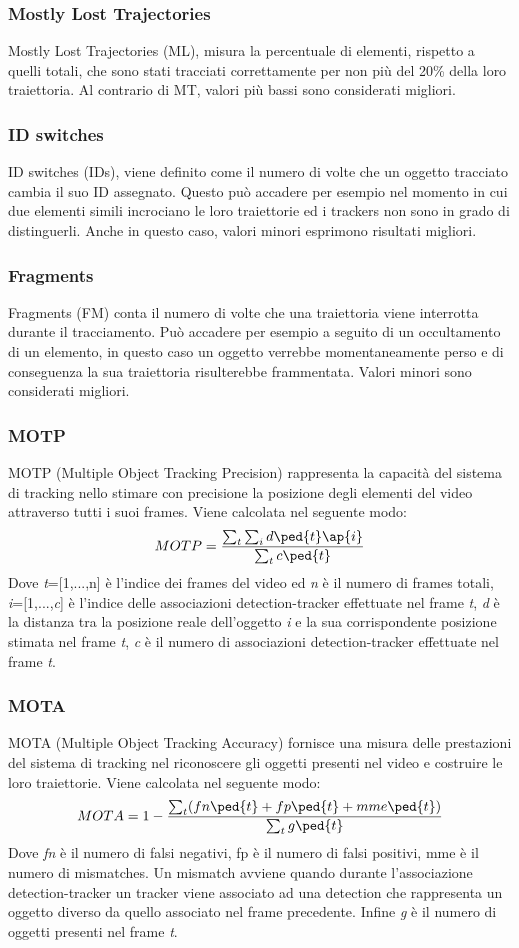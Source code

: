 \subsubsection{Mostly Lost Trajectories}
Mostly Lost Trajectories (ML), misura la percentuale di elementi, rispetto a quelli totali, che sono stati tracciati correttamente per non più del 20\% della loro traiettoria. Al contrario di MT, valori più bassi sono considerati migliori.
\subsubsection{ID switches}
ID switches (IDs), viene definito come il numero di volte che un oggetto tracciato cambia il suo ID assegnato. Questo può accadere per esempio nel momento in cui due elementi simili incrociano le loro traiettorie ed i trackers non sono in grado di distinguerli. Anche in questo caso, valori minori esprimono risultati migliori.
\subsubsection{Fragments}
Fragments (FM) conta il numero di volte che una traiettoria viene interrotta durante il tracciamento. Può accadere per esempio a seguito di un occultamento di un elemento, in questo caso un oggetto verrebbe momentaneamente perso e di conseguenza la sua traiettoria risulterebbe frammentata. Valori minori sono considerati migliori. 
\subsubsection{MOTP}
MOTP (Multiple Object Tracking Precision) rappresenta la capacità del sistema di tracking nello stimare con precisione la posizione degli elementi del video attraverso tutti i suoi frames. Viene calcolata nel seguente modo:
\[
MOTP = \frac{\sum_{t}^{}\sum_{i}^{}d\ped{t}\ap{i}}{\sum_{t}^{}c\ped{t}}
\]
Dove \textit{t}=[1,...,n] è l'indice dei frames del video ed \textit{n} è il numero di frames totali, \textit{i}=[1,...,\textit{c}] è l'indice delle associazioni detection-tracker effettuate nel frame \textit{t}, \textit{d} è la distanza tra la posizione reale dell'oggetto \textit{i} e la sua corrispondente posizione stimata nel frame \textit{t}, \textit{c} è il numero di associazioni detection-tracker effettuate nel frame \textit{t}.
\subsubsection{MOTA}
MOTA (Multiple Object Tracking Accuracy) fornisce una misura delle prestazioni del sistema di tracking nel riconoscere gli oggetti presenti nel video e costruire le loro traiettorie. Viene calcolata nel seguente modo:
\[
MOTA = 1-\frac{\sum_{t}^{}(fn\ped{t}+fp\ped{t}+mme\ped{t})}{\sum_{t}^{}g\ped{t}}
\]
Dove \textit{fn} è il numero di falsi negativi, fp è il numero di falsi positivi, mme è il numero di mismatches. Un mismatch avviene quando durante l'associazione detection-tracker un tracker viene associato ad una detection che rappresenta un oggetto diverso da quello associato nel frame precedente. Infine  \textit{g} è il numero di oggetti presenti nel frame \textit{t}.
